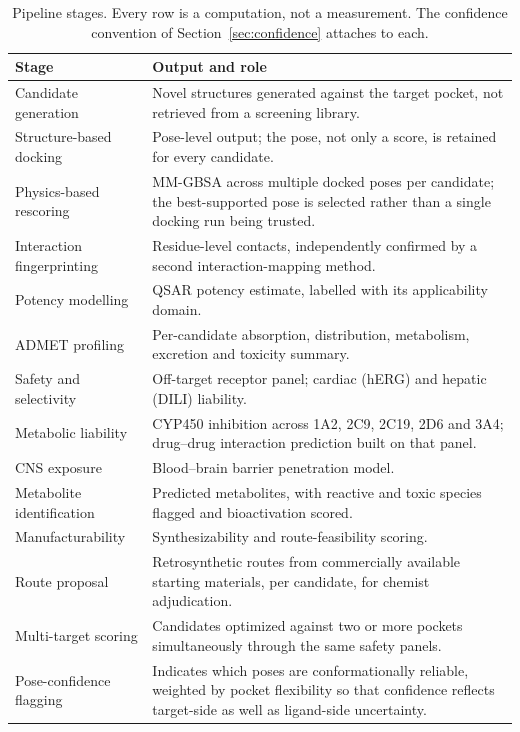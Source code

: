 \documentclass[10pt,twocolumn]{article}
\begin{document}
\begin{table}[t]
\centering
\small
\begin{tabular}{@{}p{4.6cm}p{11.2cm}@{}}
\toprule
\textbf{Stage} & \textbf{Output and role} \\
\midrule
Candidate generation & Novel structures generated against the target pocket,
not retrieved from a screening library. \\
Structure-based docking & Pose-level output; the pose, not only a score, is
retained for every candidate. \\
Physics-based rescoring & MM-GBSA across multiple docked poses per candidate;
the best-supported pose is selected rather than a single docking run being
trusted. \\
Interaction fingerprinting & Residue-level contacts, independently confirmed
by a second interaction-mapping method. \\
Potency modelling & QSAR potency estimate, labelled with its applicability
domain. \\
ADMET profiling & Per-candidate absorption, distribution, metabolism,
excretion and toxicity summary. \\
Safety and selectivity & Off-target receptor panel; cardiac (hERG) and hepatic
(DILI) liability. \\
Metabolic liability & CYP450 inhibition across 1A2, 2C9, 2C19, 2D6 and 3A4;
drug--drug interaction prediction built on that panel. \\
CNS exposure & Blood--brain barrier penetration model. \\
Metabolite identification & Predicted metabolites, with reactive and toxic
species flagged and bioactivation scored. \\
Manufacturability & Synthesizability and route-feasibility scoring. \\
Route proposal & Retrosynthetic routes from commercially available starting
materials, per candidate, for chemist adjudication. \\
Multi-target scoring & Candidates optimized against two or more pockets
simultaneously through the same safety panels. \\
Pose-confidence flagging & Indicates which poses are conformationally
reliable, weighted by pocket flexibility so that confidence reflects
target-side as well as ligand-side uncertainty. \\
\bottomrule
\end{tabular}
\caption{Pipeline stages. Every row is a computation, not a measurement. The
confidence convention of Section~\ref{sec:confidence} attaches to each.}
\label{tab:modules}
\end{table}
\end{document}
